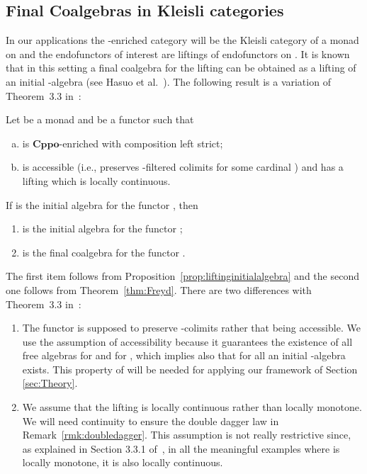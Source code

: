 \documentclass[oribibl,envcountsame,envcountsect,runningheads]{llncs}
\newcommand{\cat}[1]{\ensuremath{\mathbf{#1}}}
\newcommand{\cppo}{\cat{Cppo}}
\renewcommand{\>}{\rangle}
\begin{document}
\subsection{Final Coalgebras in Kleisli categories}\label{SSec:Coalg}

In our applications the -enriched
category will be the Kleisli category  of a
monad on  and the endofunctors of interest are liftings
 of endofunctors  on . It is known that in this
setting a final coalgebra  for the lifting  can be obtained
as a lifting of an initial -algebra (see Hasuo et
al.~\cite{HasuoJS:07}).
 The following result is a variation of Theorem~3.3 in~\cite{HasuoJS:07}:

\begin{theorem}\label{thm:HJS}
Let  be a monad and  be a functor such that
\begin{enumerate}[(a)]
 \item  is \cppo-enriched with composition left strict;
 \item  is accessible (i.e.,  preserves -filtered colimits for some cardinal ) and has a lifting  which is
   locally continuous.
\end{enumerate}
If  is the initial algebra for the functor ,
then
\begin{enumerate}
 \item  is the initial algebra for the functor ;
 \item  is the final coalgebra for the functor .
\end{enumerate}
\end{theorem}
The first item follows from Proposition~\ref{prop:liftinginitialalgebra} and the second one follows
from Theorem~\ref{thm:Freyd}. There are two differences with Theorem~3.3 in~\cite{HasuoJS:07}:
\begin{enumerate}[(1)]
\item The functor  is supposed to preserve -colimits rather that being accessible. We use the assumption of accessibility because it guarantees the existence of all free algebras for  and for , which implies also that for all  an initial -algebra exists. This property of  will be needed for applying our framework of Section \ref{sec:Theory}.

\item We assume that the lifting  is locally continuous rather than locally monotone. We will need continuity to ensure the double dagger law in Remark~\ref{rmk:doubledagger}. This assumption is not really restrictive since, as explained in Section 3.3.1 of~\cite{HasuoJS:07}, in all the meaningful examples where  is locally monotone, it is also locally continuous.
\end{enumerate}
\end{document}
